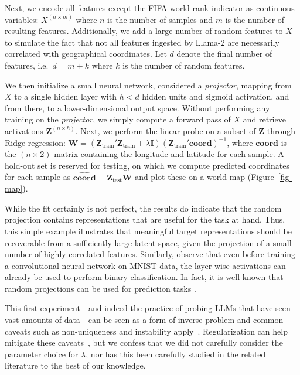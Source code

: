 Next, we encode all features except the FIFA world rank indicator as continuous variables: \(X^{(n \times m)}\) where \(n\) is the number of samples and \(m\) is the number of resulting features. Additionally, we add a large number of random features to \(X\) to simulate the fact that not all features ingested by Llama-2 are necessarily correlated with geographical coordinates. Let \(d\) denote the final number of features, i.e.~\(d=m+k\) where \(k\) is the number of random features.

We then initialize a small neural network, considered a \emph{projector}, mapping from \(X\) to a single hidden layer with \(h<d\) hidden units and sigmoid activation, and from there, to a lower-dimensional output space. Without performing any training on the \emph{projector}, we simply compute a forward pass of \(X\) and retrieve activations \(\mathbf{Z}^{(n\times h)}\). Next, we perform the linear probe on a subset of \(\mathbf{Z}\) through Ridge regression: \(\mathbf{W} = (\mathbf{Z}_{\text{train}}'\mathbf{Z}_{\text{train}} + \lambda \mathbf{I}) (\mathbf{Z}_{\text{train}}'\textbf{coord})^{-1}\), where \(\textbf{coord}\) is the \((n \times 2)\) matrix containing the longitude and latitude for each sample. A hold-out set is reserved for testing, on which we compute predicted coordinates for each sample as \(\widehat{\textbf{coord}}=\mathbf{Z}_{\text{test}}\mathbf{W}\) and plot these on a world map (Figure~\ref{fig-map}). 

While the fit certainly is not perfect, the results do indicate that the random projection contains representations that are useful for the task at hand. Thus, this simple example illustrates that meaningful target representations should be recoverable from a sufficiently large latent space, given the projection of a small number of highly correlated features. Similarly, \citet{alain2018understanding} observe that even before training a convolutional neural network on MNIST data, the layer-wise activations can already be used to perform binary classification. In fact, it is well-known that random projections can be used for prediction tasks \citep{dasgupta2013experiments}.

This first experiment---and indeed the practice of probing LLMs that have seen vast amounts of data---can be seen as a form of inverse problem and common caveats such as non-uniqueness and instability apply~\citep{altmeier2023regularization}. Regularization can help mitigate these caveats~\citep{om2001ridge}, but we confess that we did not carefully consider the parameter choice for $\lambda $, nor has this been carefully studied in the related literature to the best of our knowledge.

